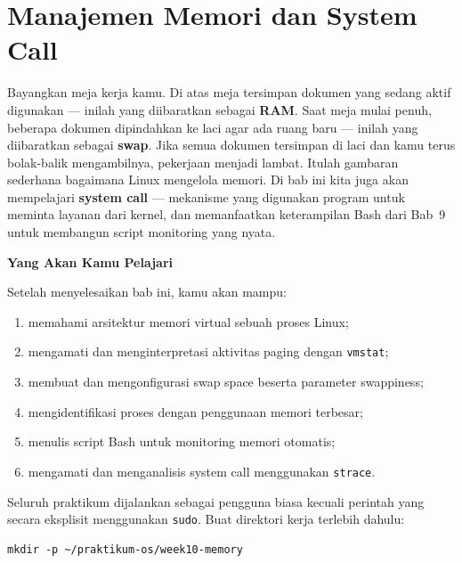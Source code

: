 \chapter{Manajemen Memori dan System Call}
\label{ch:memory-and-syscalls}

Bayangkan meja kerja kamu. Di atas meja tersimpan dokumen yang sedang aktif digunakan
--- inilah yang diibaratkan sebagai \textbf{RAM}. Saat meja mulai penuh, beberapa
dokumen dipindahkan ke laci agar ada ruang baru --- inilah yang diibaratkan sebagai
\textbf{swap}. Jika semua dokumen tersimpan di laci dan kamu terus bolak-balik
mengambilnya, pekerjaan menjadi lambat. Itulah gambaran sederhana bagaimana Linux
mengelola memori. Di bab ini kita juga akan mempelajari \textbf{system call} ---
mekanisme yang digunakan program untuk meminta layanan dari kernel, dan memanfaatkan
keterampilan Bash dari Bab~9 untuk membangun script monitoring yang nyata.

\textbf{Yang Akan Kamu Pelajari}

Setelah menyelesaikan bab ini, kamu akan mampu:

\begin{enumerate}
    \item memahami arsitektur memori virtual sebuah proses Linux;
    \item mengamati dan menginterpretasi aktivitas paging dengan \texttt{vmstat};
    \item membuat dan mengonfigurasi swap space beserta parameter swappiness;
    \item mengidentifikasi proses dengan penggunaan memori terbesar;
    \item menulis script Bash untuk monitoring memori otomatis;
    \item mengamati dan menganalisis system call menggunakan \texttt{strace}.
\end{enumerate}

\begin{notebox}
Seluruh praktikum dijalankan sebagai pengguna biasa kecuali perintah yang secara
eksplisit menggunakan \texttt{sudo}. Buat direktori kerja terlebih dahulu:
\begin{lstlisting}
mkdir -p ~/praktikum-os/week10-memory
\end{lstlisting}
\end{notebox}

